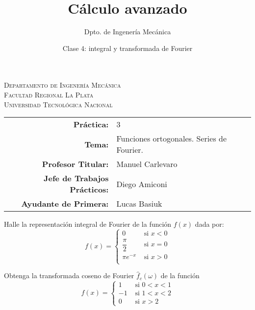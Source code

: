 \documentclass[11pt]{article}
\title{Cálculo avanzado}
\author{Dpto. de Ingenería Mecánica}
\date{Clase 4: integral y transformada de Fourier}
\begin{document}

\begin{center}
\end{center} 

\begin{center}
\vspace{\baselineskip}
\Large{\textsc{Departamento de Ingenería Mecánica}} \\
\textsc{Facultad Regional La Plata} \\
\textsc{Universidad Tecnológica Nacional}
\end{center}


\begin{center}
\begin{tabular}{r l}
    \textbf{Práctica:} & 3 \\
 \textbf{Tema:} & Funciones ortogonales. Series de Fourier. \\
 \textbf{Profesor Titular:} & Manuel Carlevaro \\
 \textbf{Jefe de Trabajos Prácticos:} & Diego Amiconi \\
 \textbf{Ayudante de Primera:} & Lucas Basiuk 
\end{tabular}\end{center}

\vspace{1em}

\begin{question} %
Halle la representación integral de Fourier de la función $f(x)$ dada por:
\[ f(x) = 
    \begin{cases}
    0 & \text{ si } x < 0 \\
    \dfrac{\pi}{2} & \text{ si } x = 0 \\
    \pi e^{-x} & \text{ si } x > 0 \\
\end{cases} \]
\end{question}


\begin{question} %
Obtenga la transformada coseno de Fourier $\hat{f}_c(\omega)$ de la función
\[ f(x) = 
\begin{cases}
    1 & \text{ si } 0 < x < 1 \\
    -1 & \text{ si } 1 < x < 2 \\
    0 & \text{ si } x > 2 
\end{cases} \]
\end{question}
\end{document}
